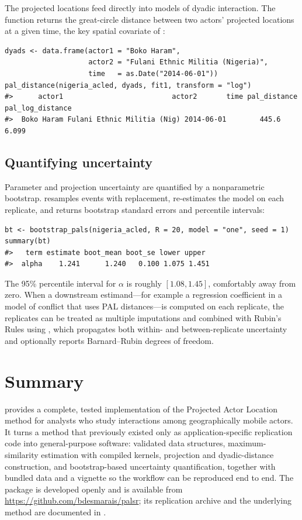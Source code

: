 The projected locations feed directly into models of dyadic interaction. The
function  returns the great-circle distance between two
actors' projected locations at a given time, the key spatial covariate of
\citet{kim2023pals}:

\begin{verbatim}
dyads <- data.frame(actor1 = "Boko Haram",
                    actor2 = "Fulani Ethnic Militia (Nigeria)",
                    time   = as.Date("2014-06-01"))
pal_distance(nigeria_acled, dyads, fit1, transform = "log")
#>      actor1                          actor2       time pal_distance pal_log_distance
#>  Boko Haram Fulani Ethnic Militia (Nig) 2014-06-01        445.6            6.099
\end{verbatim}

\subsection{Quantifying uncertainty}

Parameter and projection uncertainty are quantified by a nonparametric bootstrap.
 resamples events with replacement, re-estimates the model
on each replicate, and returns bootstrap standard errors and percentile intervals:

\begin{verbatim}
bt <- bootstrap_pals(nigeria_acled, R = 20, model = "one", seed = 1)
summary(bt)
#>   term estimate boot_mean boot_se lower upper
#>  alpha    1.241      1.240   0.100 1.075 1.451
\end{verbatim}

The 95\% percentile interval for $\alpha$ is roughly $[1.08, 1.45]$, comfortably
away from zero. When a downstream estimand---for example a regression coefficient
in a model of conflict that uses PAL distances---is computed on each replicate, the
replicates can be treated as multiple imputations and combined with Rubin's Rules
\citep{rubin1987} using , which propagates both within- and
between-replicate uncertainty and optionally reports Barnard--Rubin degrees of
freedom.

\section{Summary}

 provides a complete, tested implementation of the Projected Actor
Location method for analysts who study interactions among geographically mobile
actors. It turns a method that previously existed only as application-specific
replication code into general-purpose software: validated data structures,
maximum-similarity estimation with compiled kernels, projection and dyadic-distance
construction, and bootstrap-based uncertainty quantification, together with bundled
data and a vignette so the workflow can be reproduced end to end. The package is
developed openly and is available from \url{https://github.com/bdesmarais/palsr};
its replication archive and the underlying method are documented in
\citet{kim2023pals}.

